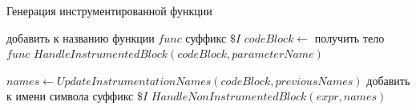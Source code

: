 \begin{algorithm}
\caption{Генерация инструментированной функции}\label{alg:ins}
\begin{algorithmic}[1]
  \State добавить к названию функции $func$ суффикс $\$I$
  \State $codeBlock \gets$ получить тело $func$
  \State $HandleInstrumentedBlock(codeBlock, parameterName)$
\EndFunction

  \State $names \gets UpdateInstrumentationNames(codeBlock, previousNames)$
      \State добавить к имени символа суффикс $\$I$
      \State $HandleNonInstrumentedBlock(expr, names)$
    \EndIf
  \EndFor
\EndFunction
\end{algorithmic}
\end{algorithm}
